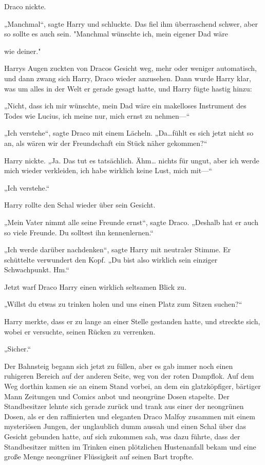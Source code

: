 {Draco nickte.

„Manchmal“, sagte Harry und schluckte. Das fiel ihm überraschend schwer, aber so sollte es auch sein. "Manchmal wünschte ich, mein eigener Dad wäre

wie deiner."

Harrys Augen zuckten von Dracos Gesicht weg, mehr oder weniger automatisch, und dann zwang sich Harry, Draco wieder anzusehen. Dann wurde Harry klar, was um alles in der Welt er gerade gesagt hatte, und Harry fügte hastig hinzu:

„Nicht, dass ich mir wünschte, mein Dad wäre ein makelloses Instrument des Todes wie Lucius, ich meine nur, mich ernst zu nehmen—“

„Ich verstehe“, sagte Draco mit einem Lächeln. „Da…fühlt es sich jetzt nicht so an, als wären wir der Freundschaft ein Stück näher gekommen?“

Harry nickte. „Ja. Das tut es tatsächlich. Ähm… nichts für ungut, aber ich werde mich wieder verkleiden, ich habe wirklich keine Lust, mich mit—“

„Ich verstehe.“

Harry rollte den Schal wieder über sein Gesicht.

„Mein Vater nimmt alle seine Freunde ernst“, sagte Draco. „Deshalb hat er auch so viele Freunde. Du solltest ihn kennenlernen.“

„Ich werde darüber nachdenken“, sagte Harry mit neutraler Stimme. Er schüttelte verwundert den Kopf. „Du bist also wirklich sein einziger Schwachpunkt. Hm.“

Jetzt warf Draco Harry einen wirklich seltsamen Blick zu.

„Willst du etwas zu trinken holen und uns einen Platz zum Sitzen suchen?“

Harry merkte, dass er zu lange an einer Stelle gestanden hatte, und streckte sich, wobei er versuchte, seinen Rücken zu verrenken.

„Sicher.“

Der Bahnsteig begann sich jetzt zu füllen, aber es gab immer noch einen ruhigeren Bereich auf der anderen Seite, weg von der roten Dampflok. Auf dem Weg dorthin kamen sie an einem Stand vorbei, an dem ein glatzköpfiger, bärtiger Mann Zeitungen und Comics anbot und neongrüne Dosen stapelte. Der Standbesitzer lehnte sich gerade zurück und trank aus einer der neongrünen Dosen, als er den raffinierten und eleganten Draco Malfoy zusammen mit einem mysteriösen Jungen, der unglaublich dumm aussah und einen Schal über das Gesicht gebunden hatte, auf sich zukommen sah, was dazu führte, dass der Standbesitzer mitten im Trinken einen plötzlichen Hustenanfall bekam und eine große Menge neongrüner Flüssigkeit auf seinen Bart tropfte.

}
